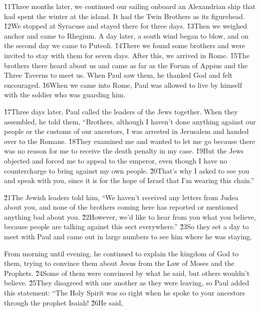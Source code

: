 \v{11}Three months later, we continued our sailing onboard an Alexandrian ship that had spent the winter at the island. It had the Twin Brothers as its figurehead. \v{12}We stopped at Syracuse and stayed there for three days. \v{13}Then we weighed anchor and came to Rhegium. A day later, a south wind began to blow, and on the second day we came to Puteoli. \v{14}There we found some brothers and were invited to stay with them for seven days. After this, we arrived in Rome. \v{15}The brothers there heard about us and came as far as the Forum of Appius and the Three Taverns to meet us. When Paul saw them, he thanked God and felt encouraged. \v{16}When we came into Rome, Paul was allowed to live by himself with the soldier who was guarding him.

\v{17}Three days later, Paul called the leaders of the Jews together. When they assembled, he told them, ``Brothers, although I haven't done anything against our people or the customs of our ancestors, I was arrested in Jerusalem and handed over to the Romans. \v{18}They examined me and wanted to let me go because there was no reason for me to receive the death penalty in my case. \v{19}But the Jews objected and forced me to appeal to the emperor, even though I have no countercharge to bring against my own people. \v{20}That's why I asked to see you and speak with you, since it is for the hope of Israel that I'm wearing this chain.''

\v{21}The Jewish leaders told him, ``We haven't received any letters from Judea about you, and none of the brothers coming here has reported or mentioned anything bad about you. \v{22}However, we'd like to hear from you what you believe, because people are talking against this sect everywhere.'' \v{23}So they set a day to meet with Paul and came out in large numbers to see him where he was staying.

From morning until evening, he continued to explain the kingdom of God to them, trying to convince them about Jesus from the Law of Moses and the Prophets. \v{24}Some of them were convinced by what he said, but others wouldn't believe. \v{25}They disagreed with one another as they were leaving, so Paul added this statement: ``The Holy Spirit was so right when he spoke to your ancestors through the prophet Isaiah! \v{26}He said,

